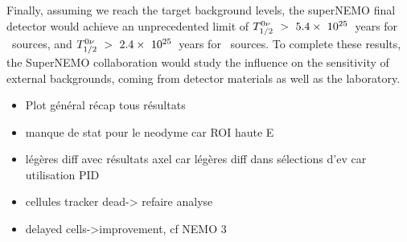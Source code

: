 Finally, assuming we reach the target background levels, the superNEMO final detector would achieve an unprecedented limit of $T_{1/2}^{0\nu}~>~5.4\times~10^{25}$~years for \Se\ sources, and $T_{1/2}^{0\nu}~>~2.4\times~10^{25}$~years for \Nd\ sources.
To complete these results, the SuperNEMO collaboration would study the influence on the sensitivity of external backgrounds, coming from detector materials as well as the laboratory.


\begin{itemize}
\item Plot général récap tous résultats

\item manque de stat pour le neodyme car ROI haute E
\item légères diff avec résultats axel car légères diff dans sélections d'ev car utilisation PID

\item cellules tracker dead-> refaire analyse
\item delayed cells->improvement, cf NEMO 3
\end{itemize}
